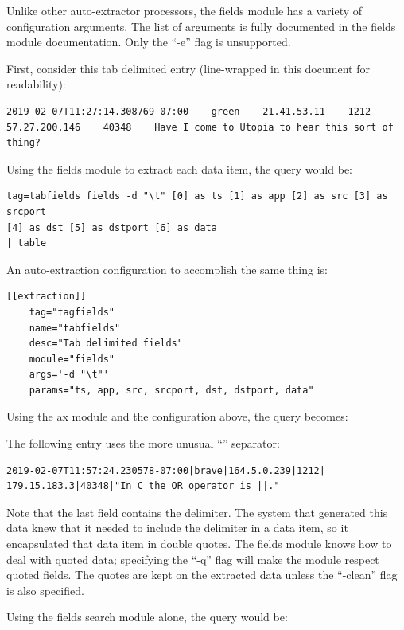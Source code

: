 Unlike other auto-extractor processors, the fields module has a variety
of configuration arguments. The list of arguments is fully documented in
the fields module documentation. Only the ``-e'' flag is unsupported.

First, consider this tab delimited entry (line-wrapped in this document for readability):

\begin{Verbatim}[breaklines=true]
2019-02-07T11:27:14.308769-07:00    green    21.41.53.11    1212    
57.27.200.146    40348    Have I come to Utopia to hear this sort of thing?
\end{Verbatim}

Using the fields module to extract each data item, the query would be:

\begin{Verbatim}[breaklines=true]
tag=tabfields fields -d "\t" [0] as ts [1] as app [2] as src [3] as srcport
[4] as dst [5] as dstport [6] as data
| table
\end{Verbatim}

An auto-extraction configuration to accomplish the same thing is:

\begin{Verbatim}[breaklines=true]
[[extraction]]
    tag="tagfields"
    name="tabfields"
    desc="Tab delimited fields"
    module="fields"
    args='-d "\t"'
    params="ts, app, src, srcport, dst, dstport, data"
\end{Verbatim}

Using the ax module and the configuration above, the query becomes:


The following entry uses the more unusual ``\textbar{}'' separator:

\begin{Verbatim}[breaklines=true]
2019-02-07T11:57:24.230578-07:00|brave|164.5.0.239|1212|
179.15.183.3|40348|"In C the OR operator is ||."
\end{Verbatim}

Note that the last field contains the delimiter. The system that
generated this data knew that it needed to include the delimiter in a
data item, so it encapsulated that data item in double quotes. The
fields module knows how to deal with quoted data; specifying the ``-q''
flag will make the module respect quoted fields. The quotes are kept on
the extracted data unless the ``-clean'' flag is also specified.

Using the fields search module alone, the query would be:

